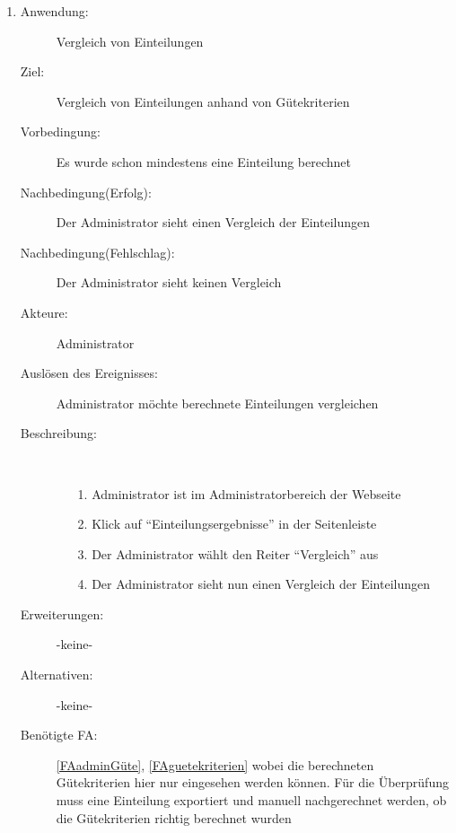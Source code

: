 \documentclass[parskip=full]{scrartcl}
\newcommand{\swtLabel}[1]{\textbf{/#1\arabic*0/}}
\begin{document}
\begin{enumerate} [label=\swtLabel{A}]
  \item \label{UCadminVergleichGuete}
    \begin{description}
  	\item[Anwendung:] Vergleich von Einteilungen
  	\item[Ziel:] Vergleich von Einteilungen anhand von Gütekriterien
  	\item[Vorbedingung:] Es wurde schon mindestens eine Einteilung berechnet
  	\item[Nachbedingung(Erfolg):] Der Administrator sieht einen Vergleich der
  	Einteilungen
  	\item[Nachbedingung(Fehlschlag):] Der Administrator sieht keinen Vergleich
  	\item[Akteure:] Administrator
  	\item[Auslösen des Ereignisses:] Administrator möchte berechnete Einteilungen
  	vergleichen
  	\item[Beschreibung:]~
  	\begin{enumerate}
  	  \item[1.] Administrator ist im Administratorbereich der Webseite
      \item[2.] Klick auf \enquote{Einteilungsergebnisse} in der Seitenleiste
      \item[3.] Der Administrator wählt den Reiter \enquote{Vergleich} aus
      \item[4.] Der Administrator sieht nun einen Vergleich der Einteilungen
  	\end{enumerate}
  	\item[Erweiterungen:] -keine-
  	\item[Alternativen:] -keine-
  	\item[Benötigte FA:] \ref{FAadminGüte}, \ref{FAguetekriterien} wobei die
  	berechneten Gütekriterien hier nur eingesehen werden können. Für die
  	Überprüfung muss eine Einteilung exportiert und manuell nachgerechnet werden,
  	ob die Gütekriterien richtig berechnet wurden
  \end{description}
  

\end{enumerate}
\end{document}
